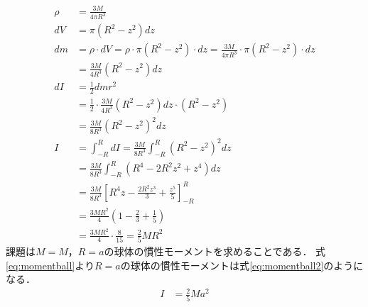 \documentclass[a4paper,11pt]{ltjsarticle}
\begin{document}
\begin{equation}
  \label{eq:momentball}
  \begin{aligned}
    \rho & = \frac{3M}{4 \pi R^3}                                                                                    \\
    dV   & = \pi (R^2 - z^2) dz                                                                                      \\
    dm   & = \rho \cdot dV = \rho \cdot \pi (R^2-z^2) \cdot dz = \frac{3M}{4 \pi R^3} \cdot \pi (R^2 - z^2) \cdot dz \\
         & = \frac{3M}{4 R^3} (R^2 - z^2) dz                                                                         \\
    dI   & = \frac{1}{2} dm r^2                                                                                      \\
         & = \frac{1}{2} \cdot \frac{3M}{4 R^3} (R^2 - z^2) dz \cdot (R^2 - z^2)                                     \\
         & = \frac{3M}{8 R^3} (R^2 - z^2)^2 dz                                                                       \\
    I    & = \int_{-R}^{R} dI = \frac{3M}{8 R^3} \int_{-R}^{R} (R^2 - z^2)^2 dz                                      \\
         & = \frac{3M}{8 R^3} \int_{-R}^{R} (R^4 - 2R^2z^2 + z^4) dz                                                 \\
         & = \frac{3M}{8 R^3} \left[ R^4z - \frac{2R^2z^3}{3} + \frac{z^5}{5} \right]_{-R}^{R}                       \\
         & = \frac{3MR^2}{4} \left(1 - \frac{2}{3} + \frac{1}{5} \right)                                             \\
         & = \frac{3MR^2}{4} \cdot \frac{8}{15} = \frac{2}{5} MR^2
  \end{aligned}
\end{equation}
課題は$M =M$，$R = a$の球体の慣性モーメントを求めることである．
式\eqref{eq:momentball}より$R = a$の球体の慣性モーメントは式\eqref{eq:momentball2}のようになる．
\begin{equation}
  \label{eq:momentball2}
  \begin{aligned}
    I & = \frac{2}{5} M a^2
  \end{aligned}
\end{equation}
\end{document}
